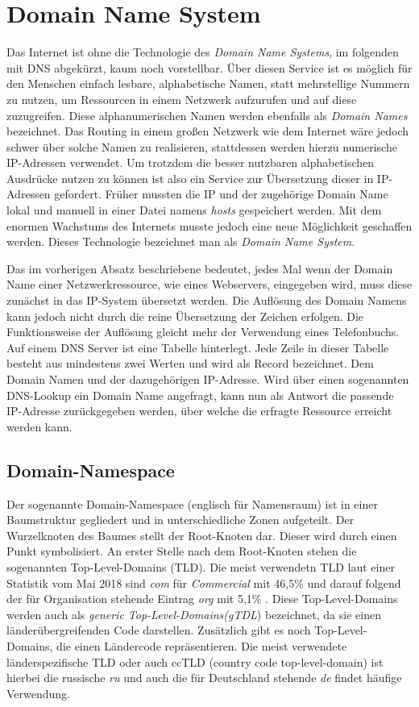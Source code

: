 
\section{Domain Name System}

Das Internet ist ohne die Technologie des \emph{Domain Name Systems}, im folgenden mit DNS abgekürzt, kaum noch vorstellbar. Über diesen Service ist es möglich für den Menschen einfach lesbare, alphabetische Namen, statt mehrstellige Nummern zu nutzen, um Ressourcen in einem Netzwerk aufzurufen und auf diese zuzugreifen. Diese alphanumerischen Namen werden ebenfalls als \emph{Domain Names} bezeichnet. Das Routing in einem großen Netzwerk wie dem Internet wäre jedoch schwer über solche Namen zu realisieren, stattdessen werden hierzu numerische IP-Adressen verwendet. Um trotzdem die besser nutzbaren alphabetischen Ausdrücke nutzen zu können ist also ein Service zur Übersetzung dieser in IP-Adressen gefordert. Früher mussten die IP und der zugehörige Domain Name lokal und manuell in einer Datei namens \textit{hosts} gespeichert werden. Mit dem enormen Wachstums des Internets musste jedoch eine neue Möglichkeit geschaffen werden. Dieses Technologie bezeichnet man als \emph{Domain Name System}. \cite{Schreiner.2016}

Das im vorherigen Absatz beschriebene bedeutet, jedes Mal wenn der Domain Name einer Netzwerkressource, wie eines Webservers, eingegeben wird, muss diese zunächst in das IP-System übersetzt werden. Die Auflösung des Domain Namens kann jedoch nicht durch die reine Übersetzung der Zeichen erfolgen. Die Funktionsweise der Auflösung gleicht mehr der Verwendung eines Telefonbuchs. Auf einem DNS Server ist eine Tabelle hinterlegt. Jede Zeile in dieser Tabelle besteht aus mindestens zwei Werten und wird als Record bezeichnet. Dem Domain Namen und der dazugehörigen IP-Adresse. Wird über einen sogenannten DNS-Lookup ein Domain Name angefragt, kann nun als Antwort die passende IP-Adresse zurückgegeben werden, über welche die erfragte Ressource erreicht werden kann.

\subsection{Domain-Namespace}
Der sogenannte Domain-Namespace (englisch für Namensraum) ist in einer Baumstruktur gegliedert und in unterschiedliche Zonen aufgeteilt. Der Wurzelknoten des Baumes stellt der Root-Knoten dar. Dieser wird durch einen Punkt symbolisiert. An erster Stelle nach dem Root-Knoten stehen die sogenannten Top-Level-Domains (TLD). Die meist verwendetn TLD laut einer Statistik vom Mai 2018 sind \textit{com} für \textit{Commercial} mit 46,5\% und darauf folgend der für Organisation stehende Eintrag \textit{org} mit 5,1\% \cite{w3techs.2018}. Diese Top-Level-Domains werden auch als \textit{generic Top-Level-Domains(gTDL}) bezeichnet, da sie einen länderübergreifenden Code darstellen. Zusätzlich gibt es noch Top-Level-Domains, die einen Ländercode repräsentieren. Die meist verwendete länderspezifische TLD oder auch ccTLD (country code top-level-domain) ist hierbei die russische \textit{ru} und auch die für Deutschland stehende \textit{de} findet häufige Verwendung. \cite{IndianaUniversity.14.05.2018} 

